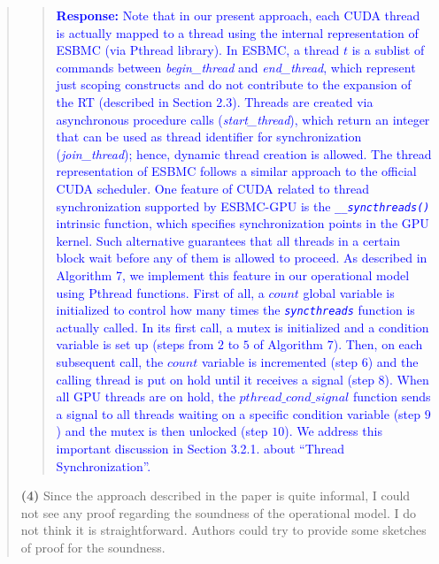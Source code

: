 \documentclass[11pt]{article}
\begin{document}
\begin{quote}
\begin{quote}
\textcolor{blue}{\textbf{Response:} Note that in our present approach, each CUDA thread is actually mapped to a thread using the internal representation of ESBMC (via Pthread library). In ESBMC, a thread $t$ is a sublist of commands between \emph{begin\_thread} and \emph{end\_thread}, which represent just scoping constructs and do not contribute to the expansion of the RT (described in Section 2.3). Threads are created via asynchronous procedure calls (\emph{start\_thread}), which return an integer that can be used as thread identifier for synchronization (\emph{join\_thread}); hence, dynamic thread creation is allowed. The thread representation of ESBMC follows a similar approach to the official CUDA scheduler. 
One feature of CUDA related to thread synchronization supported by ESBMC-GPU is the \emph{\tt \_\_syncthreads()} intrinsic function, which specifies synchronization points in the GPU kernel. Such alternative guarantees that all threads in a certain block wait before any of them is allowed to proceed. As described in Algorithm 7, we implement this feature in our operational model using Pthread functions. First of all, a $count$ global variable is initialized to control how many times the \emph{\tt syncthreads} function is actually called. In its first call, a mutex is initialized and a condition variable is set up (steps from $2$ to $5$ of Algorithm $7$). Then, on each subsequent call, the $count$ variable is incremented (step $6$) and the calling thread is put on hold until it receives a signal (step $8$). When all GPU threads are on hold, the $pthread\_cond\_signal$ function sends a signal to all threads waiting on a specific condition variable (step $9$) and the mutex is then unlocked (step $10$). We address this important discussion in Section 3.2.1. about ``Thread Synchronization''. }
\end{quote}


{\bf(4)} Since the approach described in the paper is quite informal, I could not see
any proof regarding the soundness of the operational model. I do not think it
is straightforward. Authors could try to provide some sketches of proof for
the soundness.


\end{quote}
\end{document}
